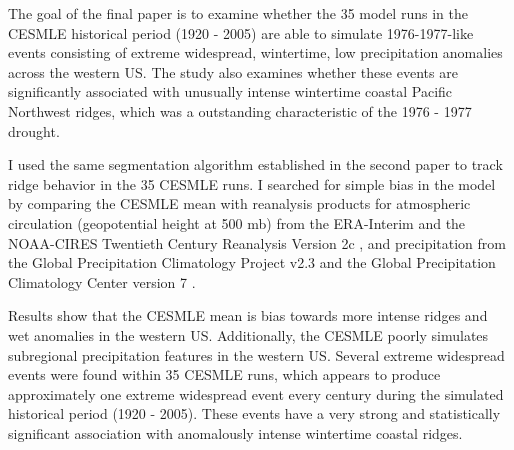 \documentclass[final, double]{ua-thesis}
\begin{document}
The goal of the final paper is to examine whether the 35 model runs in the CESMLE historical period (1920 - 2005) are able to simulate 1976-1977-like events consisting of extreme widespread, wintertime, low precipitation anomalies across the western US. The study also examines whether these events are significantly associated with unusually intense wintertime coastal Pacific Northwest ridges, which was a outstanding characteristic of the 1976 - 1977 drought.

I used the same segmentation algorithm established in the second paper to track ridge behavior in the 35 CESMLE runs. I searched for simple bias in the model by comparing the CESMLE mean with reanalysis products for atmospheric circulation (geopotential height at 500 mb) from the ERA-Interim \citep{dee_era-interim_2011} and the NOAA-CIRES Twentieth Century Reanalysis Version 2c \citep{compo_twentieth_2011}, and precipitation from the Global Precipitation Climatology Project v2.3 \citep{adler_version-2_2003} and the Global Precipitation Climatology Center version 7 \citep{schneider_gpcc_2015}.

Results show that the CESMLE mean is bias towards more intense ridges and wet anomalies in the western US. Additionally, the CESMLE poorly simulates subregional precipitation features in the western US. Several extreme widespread events were found within 35 CESMLE runs, which appears to produce approximately one extreme widespread event every century during the simulated historical period (1920 - 2005). These events have a very strong and statistically significant association with anomalously intense wintertime coastal ridges.


% 
\end{document}
